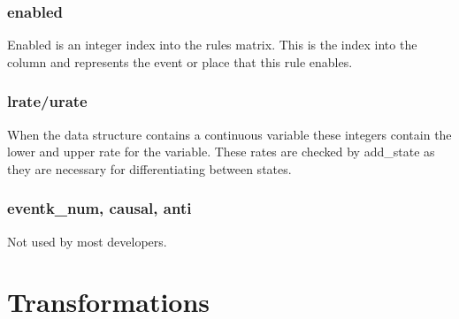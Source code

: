 \documentclass[titlepage,11pt]{article}
\begin{document}
  \subsubsection{enabled}
  Enabled is an integer index into the rules matrix.  This is the
  index into the column and represents the event or place that this
  rule enables.

	\subsubsection{lrate/urate}
	When the data structure contains a continuous variable these integers contain the lower and upper rate for the variable.  These rates are checked by add\_state as they are necessary for differentiating between states.

  \subsubsection{eventk\_num, causal, anti}
  Not used by most developers.

  \section{Transformations}
  
\end{document}
